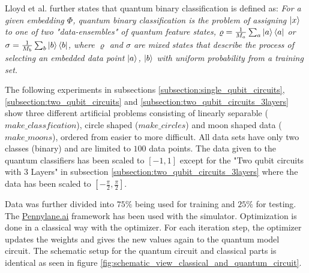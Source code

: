 Lloyd et al.\cite{Quantum_embeddings_for_machine_learning_2020} further states that quantum binary classification is defined as: \textit{For a given embedding $\Phi$, quantum binary classification is the problem of assigning $\ket{x}$ to one
of two "data-ensembles" of quantum feature states, $\varrho = \frac{1}{M_a} \sum_{a} \ket{a} \bra{a} $ or $ \sigma = \frac{1}{M_b} \sum_{b} \ket{b} \bra{b} $, where $\varrho$ and $\sigma$ are mixed states that describe the process of selecting an embedded data point $\ket{a}$, $\ket{b}$ with uniform probability from a training set.}
\hfill \break

\clearpage
The following experiments in subsections \ref{subsection:single_qubit_circuits}, \ref{subsection:two_qubit_circuits} and \ref{subsection:two_qubit_circuits_3layers} show three different artificial problems consisting of linearly separable ($make\_classfication$), circle shaped ($make\_circles$) and moon shaped data ($make\_moons$), ordered from easier to more difficult. All data sets have only two classes (binary) and are limited to $100$ data points. The data given to the quantum classifiers has been scaled to $[-1,1]$ except for the "Two qubit circuits with 3 Layers" in subsection \ref{subsection:two_qubit_circuits_3layers} where the data has been scaled to $[-\frac{\pi}{2},\frac{\pi}{2}]$.

Data was further divided into $75\%$ being used for training and $25\%$ for testing. The \href{https://www.pennylane.ai}{Pennylane.ai} framework has been used with the \href{https://pennylane.readthedocs.io/en/stable/code/api/pennylane.devices.default_qubit.html#module-pennylane.devices.default_qubit}{} simulator. Optimization is done in a classical way with the \href{https://pennylane.readthedocs.io/en/stable/code/api/pennylane.NesterovMomentumOptimizer.html}{} optimizer. For each iteration step, the optimizer updates the weights and gives the new values again to the quantum model circuit. The schematic setup for the quantum circuit and classical parts is identical as seen in figure \ref{fig:schematic_view_classical_and_quantum_circuit}. 

\hfill \break

